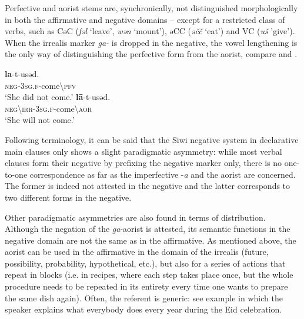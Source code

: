 \documentclass[output=paper,colorlinks,citecolor=brown]{langscibook}
\begin{document}


Perfective and aorist stems are, synchronically, not distinguished morphologically in both the affirmative and negative domains – except for a restricted class of verbs, such as CəC (\textit{fəl} ‘leave’, \textit{wən} ‘mount’), əCC (\textit{əčč} ‘eat’) and VC (\textit{uš} 'give'). When the irrealis marker \textit{ga-} is dropped in the negative, the vowel lengthening is the only way of distinguishing the perfective form from the aorist, compare  and .


\ea\label{ex:siw:7}
    \ea\label{ex:siw:7a}
        \gll \textbf{la}{}-t-usəd. \\ 
             \textsc{neg-3sg.f}{}-come{\textbackslash}\textsc{pfv} \\
        \glt ‘She did not come.’
    \ex\label{ex:siw:7b}
        \gll \textbf{lā}{}-t-usəd. \\
             \textsc{neg}{\textbackslash}\textsc{irr-3sg.f}{}-come{\textbackslash}\textsc{aor} \\
        \glt ‘She will not come.’
    \z
\z 

Following  terminology, it can be said that the Siwi negative system in declarative main clauses only shows a slight paradigmatic asymmetry: while most verbal clauses form their negative by prefixing the negative marker only, there is no one-to-one correspondence as far as the imperfective -\textit{a} and the aorist are concerned. The former is indeed not attested in the negative and the latter corresponds to two different forms in the negative. 

Other paradigmatic asymmetries are also found in terms of distribution. Although the negation of the \textit{ga}{}-aorist is attested, its semantic functions in the negative domain are not the same as in the affirmative. As mentioned above, the aorist can be used in the affirmative in the domain of the irrealis (future, possibility, probability, hypothetical, etc.), but also for a series of actions that repeat in blocks \citep[100]{Leguil1986} (i.e. in recipes, where each step takes place once, but the whole procedure needs to be repeated in its entirety every time one wants to prepare the same dish again). Often, the referent is generic: see example  in which the speaker explains what everybody does every year during the Eid celebration.
\end{document}
